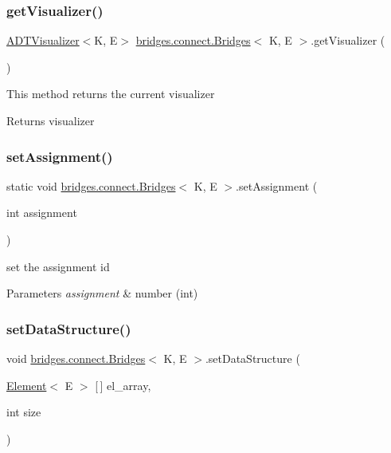 \subsubsection{\texorpdfstring{get\+Visualizer()}{getVisualizer()}}
{\footnotesize\ttfamily \hyperlink{classbridges_1_1base_1_1_a_d_t_visualizer}{A\+D\+T\+Visualizer}$<$K, E$>$ \hyperlink{classbridges_1_1connect_1_1_bridges}{bridges.\+connect.\+Bridges}$<$ K, E $>$.get\+Visualizer (\begin{DoxyParamCaption}{ }\end{DoxyParamCaption})}

This method returns the current visualizer \begin{DoxyReturn}{Returns}
visualizer 
\end{DoxyReturn}
\hypertarget{classbridges_1_1connect_1_1_bridges_a24c91901a59ab8b715a864ab8a4d9cdc}{}\label{classbridges_1_1connect_1_1_bridges_a24c91901a59ab8b715a864ab8a4d9cdc} 
\subsubsection{\texorpdfstring{set\+Assignment()}{setAssignment()}}
{\footnotesize\ttfamily static void \hyperlink{classbridges_1_1connect_1_1_bridges}{bridges.\+connect.\+Bridges}$<$ K, E $>$.set\+Assignment (\begin{DoxyParamCaption}\item[{int}]{assignment }\end{DoxyParamCaption})\hspace{0.3cm}{\ttfamily [static]}}

set the assignment id


\begin{DoxyParams}{Parameters}
{\em assignment} & number (int) \\
\hline
\end{DoxyParams}
\hypertarget{classbridges_1_1connect_1_1_bridges_a0cc12a419997a8ef0ef54afe9e65d1e9}{}\label{classbridges_1_1connect_1_1_bridges_a0cc12a419997a8ef0ef54afe9e65d1e9} 
\subsubsection{\texorpdfstring{set\+Data\+Structure()}{setDataStructure()}\hspace{0.1cm}{\footnotesize\ttfamily [1/12]}}
{\footnotesize\ttfamily void \hyperlink{classbridges_1_1connect_1_1_bridges}{bridges.\+connect.\+Bridges}$<$ K, E $>$.set\+Data\+Structure (\begin{DoxyParamCaption}\item[{\hyperlink{classbridges_1_1base_1_1_element}{Element}$<$ E $>$ \mbox{[}$\,$\mbox{]}}]{el\+\_\+array,  }\item[{int}]{size }\end{DoxyParamCaption})}

